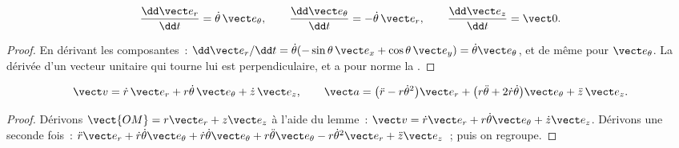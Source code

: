 \begin{lemma}\label{lem:b1:point-kinematics:basisderiv}
\[
\frac{\dd\vect e_r}{\dd t} = \dot\theta\,\vect e_\theta, \qquad
\frac{\dd\vect e_\theta}{\dd t} = -\dot\theta\,\vect e_r, \qquad
\frac{\dd\vect e_z}{\dd t} = \vect 0 .
\]
\end{lemma}

\begin{proof}
En dérivant les composantes~: $\dd\vect e_r/\dd t = \dot\theta(-\sin\theta\,
\vect e_x + \cos\theta\,\vect e_y) = \dot\theta\vect e_\theta$, et de
même pour $\vect e_\theta$. La dérivée d'un vecteur unitaire qui tourne
lui est perpendiculaire, et a pour norme la .
\end{proof}

\begin{theorem}\label{thm:b1:point-kinematics:cylindrical}
\[
\vect v = \dot r\,\vect e_r + r\dot\theta\,\vect e_\theta + \dot z\,\vect e_z,
\qquad
\vect a = \big(\ddot r - r\dot\theta^2\big)\vect e_r
+ \big(r\ddot\theta + 2\dot r\dot\theta\big)\vect e_\theta + \ddot z\,\vect e_z .
\]
\end{theorem}

\begin{proof}
Dérivons $\vect{OM} = r\vect e_r + z\vect e_z$ à l'aide du lemme~:
$\vect v = \dot r\vect e_r + r\dot\theta\vect e_\theta + \dot z\vect e_z$.
Dérivons une seconde fois~: $\ddot r\vect e_r + \dot r\dot\theta\vect e_\theta +
\dot r\dot\theta\vect e_\theta + r\ddot\theta\vect e_\theta - r\dot\theta^2
\vect e_r + \ddot z\vect e_z$~; puis on regroupe.
\end{proof}

